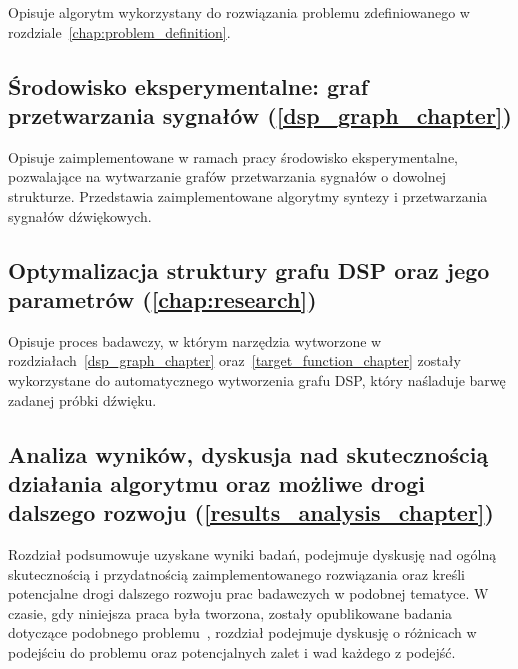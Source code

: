 Opisuje algorytm wykorzystany do rozwiązania problemu
zdefiniowanego w rozdziale~\ref{chap:problem_definition}.

\subsection*{Środowisko eksperymentalne: graf przetwarzania sygnałów (\ref{dsp_graph_chapter}) }

Opisuje zaimplementowane w ramach pracy środowisko eksperymentalne, pozwalające na wytwarzanie
grafów przetwarzania sygnałów o dowolnej strukturze. Przedstawia zaimplementowane algorytmy syntezy i przetwarzania sygnałów dźwiękowych.


\subsection*{Optymalizacja struktury grafu DSP oraz jego parametrów (\ref{chap:research}) }

Opisuje proces badawczy, w którym narzędzia wytworzone w rozdziałach~\ref{dsp_graph_chapter} oraz~\ref{target_function_chapter}
zostały wykorzystane do automatycznego wytworzenia grafu DSP, który naśladuje barwę zadanej próbki dźwięku.

\subsection*{Analiza wyników, dyskusja nad skutecznością działania algorytmu oraz możliwe drogi dalszego rozwoju (\ref{results_analysis_chapter})}

Rozdział podsumowuje uzyskane wyniki badań, podejmuje dyskusję nad ogólną skutecznością i przydatnością zaimplementowanego rozwiązania oraz
kreśli potencjalne drogi dalszego rozwoju prac badawczych w podobnej tematyce. W czasie, gdy niniejsza praca była tworzona, zostały opublikowane badania
dotyczące podobnego problemu~\cite{ieee_synth_programming}, rozdział podejmuje dyskusję o różnicach w podejściu do problemu oraz potencjalnych
zalet i wad każdego z podejść.

